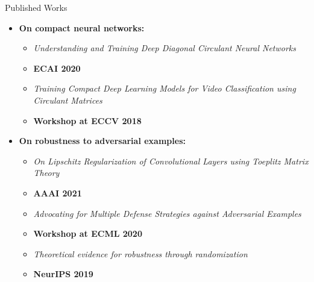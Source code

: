 \begin{frame}{Published Works}

  {\small
  \begin{itemize}[leftmargin=0pt]
    \item \textbf{On compact neural networks:} \vspace{0.1cm}
    \begin{itemize}[leftmargin=0.3cm]
      \item \textit{Understanding and Training Deep Diagonal Circulant Neural Networks}
      \item {} \hfill \textbf{ECAI 2020}\vspace{0.1cm}
      \item \textit{Training Compact Deep Learning Models for Video Classification using Circulant Matrices}
      \item {} \hfill \textbf{Workshop at ECCV 2018}
    \end{itemize} \vspace{0.3cm}

    \item \textbf{On robustness to adversarial examples:} \vspace{0.1cm}
    \begin{itemize}[leftmargin=0.3cm]
      \item \textit{On Lipschitz Regularization of Convolutional Layers using Toeplitz Matrix Theory}
      \item {} \hfill \textbf{AAAI 2021}\vspace{0.1cm}
      \item \textit{Advocating for Multiple Defense Strategies against Adversarial Examples}
      \item {} \hfill \textbf{Workshop at ECML 2020}\vspace{0.1cm}
      \item \textit{Theoretical evidence for robustness through randomization}
      \item {} \hfill \textbf{NeurIPS 2019}
    \end{itemize}
  \end{itemize}
  }

\end{frame}


